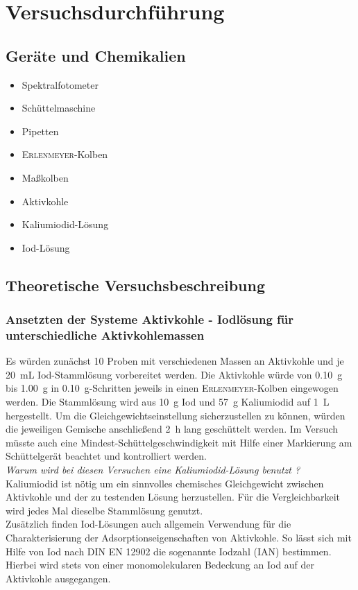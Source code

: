 \newpage
\section{Versuchsdurchführung}
\label{sec:durchfuerung}
\subsection*{Geräte und Chemikalien}
\begin{itemize}
	\item Spektralfotometer
	\item Schüttelmaschine
	\item Pipetten
	\item \textsc{Erlenmeyer}-Kolben
	\item Maßkolben
	\item Aktivkohle
	\item Kaliumiodid-Lösung
	\item Iod-Lösung
\end{itemize}

\subsection*{Theoretische Versuchsbeschreibung}
\subsubsection*{Ansetzten der Systeme Aktivkohle - Iodlösung für unterschiedliche Aktivkohlemassen}
Es würden zunächst 10 Proben mit verschiedenen Massen an Aktivkohle und je \SI{20}{\milli \liter} Iod-Stammlösung vorbereitet werden. Die Aktivkohle würde von \SI{0,10}{\gram} bis \SI{1,00}{\gram} in \SI{0,10}{\gram}-Schritten jeweils in einen \textsc{Erlenmeyer}-Kolben eingewogen werden. Die Stammlösung wird aus \SI{10}{\gram} Iod und \SI{57}{\gram} Kaliumiodid auf \SI{1}{\liter} hergestellt. Um die Gleichgewichtseinstellung sicherzustellen zu können, würden die jeweiligen Gemische anschließend \SI{2}{\hour} lang geschüttelt werden. Im Versuch müsste auch eine Mindest-Schüttelgeschwindigkeit mit Hilfe einer Markierung am Schüttelgerät beachtet und kontrolliert werden.\\

\textit{Warum wird bei diesen Versuchen eine Kaliumiodid-Lösung benutzt ?}\\
Kaliumiodid ist nötig um ein sinnvolles chemisches Gleichgewicht zwischen Aktivkohle und der zu testenden Lösung herzustellen. Für die Vergleichbarkeit wird jedes Mal dieselbe Stammlösung genutzt. \\
Zusätzlich finden Iod-Lösungen auch allgemein Verwendung für die Charakterisierung der Adsorptionseigenschaften von Aktivkohle. So lässt sich mit Hilfe von Iod nach DIN EN 12902 die sogenannte Iodzahl (IAN) bestimmen. Hierbei wird stets von einer monomolekularen Bedeckung an Iod auf der Aktivkohle ausgegangen. \cite{iodzahl_IAN}


